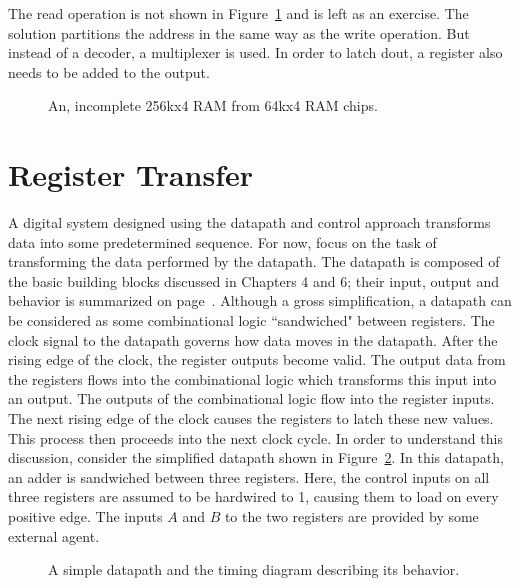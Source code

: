 The read operation is not shown in Figure~\ref{fig:sequentialBBdeep} and is left
as an exercise.  The solution partitions the address in the same way as the
write operation.  But instead of a decoder, a multiplexer is used.  In order to
latch dout, a register also needs to be added to the output.

\begin{figure}[ht]

    \caption{An, incomplete 256kx4 RAM from 64kx4 RAM chips.}
    \label{fig:sequentialBBdeep}

\end{figure}

\section{Register Transfer}
A digital system designed using the datapath and control approach
transforms data into some predetermined sequence.  For now, focus
on the task of transforming the data performed by the datapath.
The datapath is composed of the basic building blocks discussed in
Chapters 4 and 6; their input, output and behavior is summarized on
page~\pageref{page:boxlist}.  Although a gross simplification, a
datapath can be considered as some combinational logic ``sandwiched"
between registers.  The clock signal to the datapath governs how
data moves in the datapath. After the rising edge of the clock, the
register outputs become valid. The output data from the registers
flows into the combinational logic which transforms this input into
an output.  The outputs of the combinational logic flow into the
register inputs.  The next rising edge of the clock causes the
registers to latch these new values.  This process then proceeds
into the next clock cycle.  In order to understand this discussion,
consider the simplified datapath shown in Figure~\ref{fig:sequentialBBsimple}.
In this datapath, an adder is sandwiched between three registers.
Here, the control inputs on all three registers are assumed to be
hardwired to 1, causing them to load on every positive edge.  The
inputs $A$ and $B$ to the two registers are provided by some
external agent.

\begin{figure}[ht]

\caption{A simple datapath and the timing diagram describing its
behavior.}
\label{fig:sequentialBBsimple}

\end{figure}

